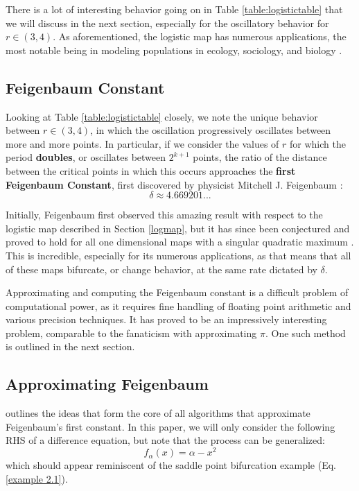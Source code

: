 \documentclass{article}
\theoremstyle{definition}
\theoremstyle{remark}
\begin{document}
There is a lot of interesting behavior going on in Table \ref{table:logistictable} that we will discuss in the next section, especially for the oscillatory behavior for $r \in (3, 4)$. As aforementioned, the logistic map has numerous applications, the most notable being in modeling populations in ecology, sociology, and biology \cite{May1976}.
\subsection{Feigenbaum Constant}
Looking at Table \ref{table:logistictable} closely, we note the unique behavior between $r \in (3, 4)$, in which the oscillation progressively oscillates between more and more points. In particular, if we consider the values of $r$ for which the period \textbf{doubles}, or oscillates between $2^{k+1}$ points, the ratio of the distance between the critical points in which this occurs approaches the \textbf{first Feigenbaum Constant}, first discovered by physicist Mitchell J. Feigenbaum \cite{Feigenbaum1978}:
\begin{equation}
    \boxed{\delta \approx 4.669201...}
\end{equation}

Initially, Feigenbaum first observed this amazing result with respect to the logistic map described in Section \ref{logmap}, but it has since been conjectured and proved to hold for all one dimensional maps with a singular quadratic maximum \cite{Lanford1982, Tabor1989}. This is incredible, especially for its numerous applications, as that means that all of these maps bifurcate, or change behavior, at the same rate dictated by $\delta$.

Approximating and computing the Feigenbaum constant is a difficult problem of computational power, as it requires fine handling of floating point arithmetic and various precision techniques. It has proved to be an impressively interesting problem, comparable to the fanaticism with approximating $\pi$. One such method is outlined in the next section.
\subsection{Approximating Feigenbaum}
\cite{Briggs1991} outlines the ideas that form the core of all algorithms that approximate Feigenbaum's first constant. In this paper, we will only consider the following RHS of a difference equation, but note that the process can be generalized:
\begin{equation}\label{feigenbaumex}
    f_\alpha(x) = \alpha - x^2
\end{equation}
which should appear reminiscent of the saddle point bifurcation example (Eq. \ref{example 2.1}).
\end{document}
